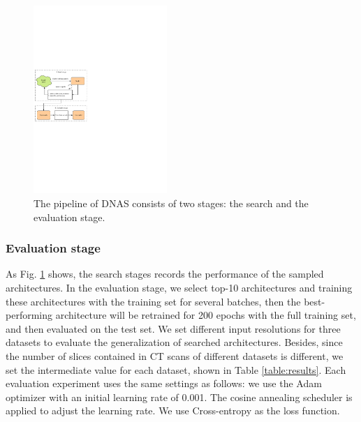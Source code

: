 \documentclass[letterpaper]{article}
\begin{document}
\begin{figure}[!ht]
    \centering
    \includegraphics[width=0.45\textwidth]{images/gdas.pdf}
    \caption{The pipeline of DNAS consists of two stages: the search and the evaluation stage.}
    \label{fig:gdas}
\end{figure}


\subsubsection{Evaluation stage}

As Fig. \ref{fig:gdas} shows, the search stages records the performance of the sampled architectures. In the evaluation stage, we select top-10 architectures and training these architectures with the training set for several batches, then the best-performing architecture will be retrained for 200 epochs with the full training set, and then evaluated on the test set. We set different input resolutions for three datasets to evaluate the generalization of searched architectures. Besides, since the number of slices contained in CT scans of different datasets is different, we set the intermediate value for each dataset, shown in Table \ref{table:results}. Each evaluation experiment uses the same settings as follows: we use the Adam \cite{adam} optimizer with an initial learning rate of 0.001. The cosine annealing scheduler \cite{cosineannealinglr} is applied to adjust the learning rate. We use Cross-entropy as the loss function.
\end{document}
